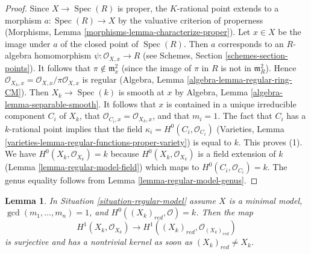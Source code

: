 \documentclass{stacks-project}
\theoremstyle{plain}
\newtheorem{lemma}[subsection]{Lemma}
\theoremstyle{definition}
\theoremstyle{remark}
\numberwithin{equation}{subsection}
\def\Spec{\mathop{\mathrm{Spec}}}
\begin{document}
\begin{proof}
Since $X \to \Spec(R)$ is proper, the $K$-rational point extends to
a morphism $a : \Spec(R) \to X$ by the valuative criterion of properness
(Morphisms, Lemma \ref{morphisms-lemma-characterize-proper}).
Let $x \in X$ be the image under $a$ of the closed point of $\Spec(R)$.
Then $a$ corresponds to an $R$-algebra homomorphism
$\psi : \mathcal{O}_{X, x} \to R$
(see Schemes, Section \ref{schemes-section-points}).
It follows that $\pi \not \in \mathfrak m_x^2$ (since the image
of $\pi$ in $R$ is not in $\mathfrak m_R^2$).
Hence $\mathcal{O}_{X_k, x} = \mathcal{O}_{X, x}/\pi \mathcal{O}_{X, x}$
is regular (Algebra, Lemma \ref{algebra-lemma-regular-ring-CM}).
Then $X_k \to \Spec(k)$ is smooth at $x$ by
Algebra, Lemma \ref{algebra-lemma-separable-smooth}.
It follows that $x$ is contained in a unique irreducible component
$C_i$ of $X_k$, that $\mathcal{O}_{C_i, x} = \mathcal{O}_{X_k, x}$,
and that $m_i = 1$. The fact that $C_i$ has a
$k$-rational point implies that the field
$\kappa_i = H^0(C_i, \mathcal{O}_{C_i})$
(Varieties, Lemma \ref{varieties-lemma-regular-functions-proper-variety})
is equal to $k$. This proves (1). We have
$H^0(X_k, \mathcal{O}_{X_k}) = k$
because $H^0(X_k, \mathcal{O}_{X_k})$ is a field
extension of $k$ (Lemma \ref{lemma-regular-model-field})
which maps to $H^0(C_i, \mathcal{O}_{C_i}) = k$.
The genus equality follows from Lemma \ref{lemma-regular-model-genus}.
\end{proof}

\begin{lemma}
\label{lemma-genus-reduction-smaller}
In Situation \ref{situation-regular-model} assume $X$ is a minimal model,
$\gcd(m_1, \ldots, m_n) = 1$, and $H^0((X_k)_{red}, \mathcal{O}) = k$. Then
the map
$$
H^1(X_k, \mathcal{O}_{X_k}) \to H^1((X_k)_{red}, \mathcal{O}_{(X_k)_{red}})
$$
is surjective and has a nontrivial kernel as soon as $(X_k)_{red} \not = X_k$.
\end{lemma}
\end{document}
